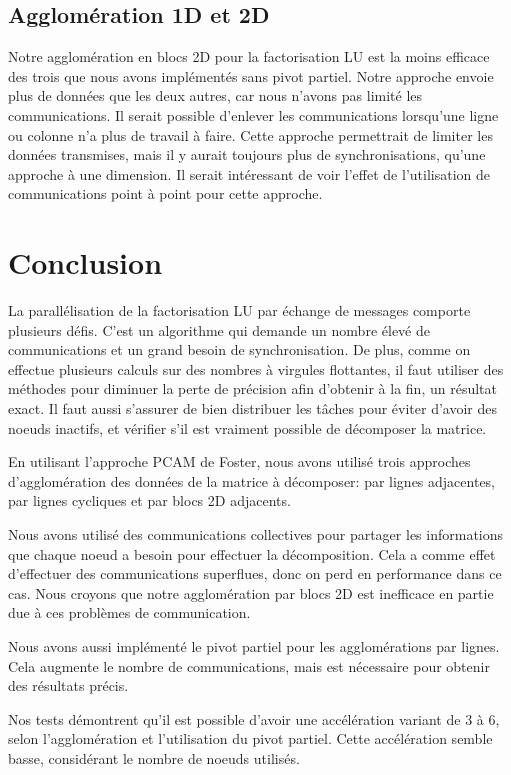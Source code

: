 \documentclass[12pt,letterpaper]{article} %
\begin{document}
\subsection{Agglomération 1D et 2D}

Notre agglomération en blocs 2D pour la factorisation LU est la moins efficace des trois
que nous avons implémentés sans pivot partiel. Notre approche envoie plus de données que
les deux autres, car nous n'avons pas limité les communications. Il serait possible
d'enlever les communications lorsqu'une ligne ou colonne n'a plus de travail à faire.
Cette approche permettrait de limiter les données transmises, mais il y aurait
toujours plus de synchronisations, qu'une approche à une dimension. Il serait
intéressant de voir l'effet de l'utilisation de communications point à point
pour cette approche.

\section{Conclusion}

La parallélisation de la factorisation LU par échange de messages comporte
plusieurs défis. C'est un algorithme qui demande un nombre élevé de communications
et un grand besoin de synchronisation. De plus, comme on effectue plusieurs
calculs sur des nombres à virgules flottantes, il faut utiliser des méthodes
pour diminuer la perte de précision afin d'obtenir à la fin, un résultat
exact. Il faut aussi s'assurer de bien distribuer les tâches pour éviter
d'avoir des noeuds inactifs, et vérifier s'il est vraiment possible de 
décomposer la matrice.

En utilisant l'approche PCAM de Foster, nous avons utilisé trois approches
d'agglomération des données de la matrice à décomposer: 
par lignes adjacentes, par lignes cycliques et par blocs 2D adjacents. 

Nous avons utilisé des communications collectives pour partager
les informations que chaque noeud a besoin pour effectuer la décomposition.
Cela a comme effet d'effectuer des communications superflues, donc on perd
en performance dans ce cas. Nous croyons que notre agglomération par blocs 2D
est inefficace en partie due à ces problèmes de communication.

Nous avons aussi implémenté le pivot partiel pour les agglomérations par lignes.
Cela augmente le nombre de communications, mais est nécessaire pour obtenir des
résultats précis.

Nos tests démontrent qu'il est possible d'avoir une accélération variant de 3 à
6, selon l'agglomération et l'utilisation du pivot partiel. Cette accélération
semble basse, considérant le nombre de noeuds utilisés.


\begingroup
{}


\endgroup
\end{document}
